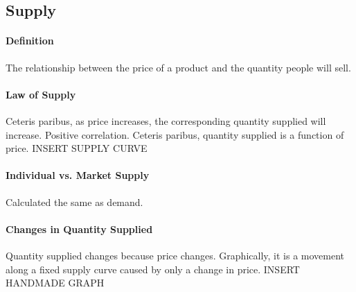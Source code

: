 \subsection{Supply}
\paragraph{Definition} The relationship between the price of a product and the quantity people will sell.
\paragraph{Law of Supply} Ceteris paribus, as price increases, the corresponding quantity supplied will increase. Positive correlation. Ceteris paribus, quantity supplied is a function of price. INSERT SUPPLY CURVE
\paragraph{Individual vs. Market Supply}
Calculated the same as demand.
\paragraph{Changes in Quantity Supplied} Quantity supplied changes because price changes. Graphically, it is a movement along a fixed supply curve caused by only a change in price. INSERT HANDMADE GRAPH
